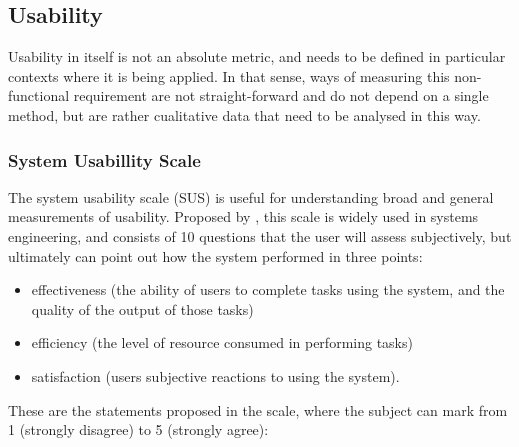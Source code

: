 \subsection{Usability}

Usability in itself is not an absolute metric, and needs to be defined in particular contexts where it is being applied. In that sense, ways of measuring this non-functional requirement are not straight-forward and do not depend on a single method, but are rather cualitative data that need to be analysed in this way.

\subsubsection{System Usabillity Scale}

The system usability scale (SUS) is useful for understanding broad and general measurements of usability. Proposed by \cite{art:sus-1996}, this scale is widely used in systems engineering, and consists of 10 questions that the user will assess subjectively, but ultimately can point out how the system performed in three points:

\begin{itemize}
    \item effectiveness (the ability of users to complete tasks using the system, and the quality of the output of those tasks)
    \item efficiency (the level of resource consumed in performing tasks)
    \item satisfaction (users subjective reactions to using the system). \citep{art:sus-1996}
\end{itemize}

These are the statements proposed in the scale, where the subject can mark from 1 (strongly disagree) to 5 (strongly agree):

